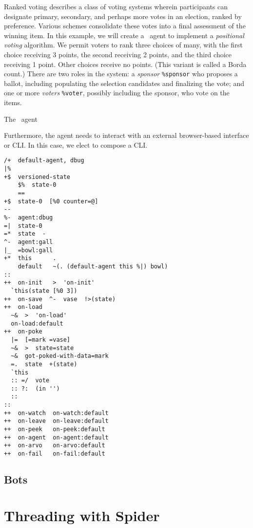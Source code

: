 Ranked voting describes a class of voting systems wherein participants can designate primary, secondary, and perhaps more votes in an election, ranked by preference.  Various schemes consolidate these votes into a final assessment of the winning item.  In this example, we will create a \gall~agent to implement a \emph{positional voting} algorithm.  We permit voters to rank three choices of many, with the first choice receiving 3 points, the second receiving 2 points, and the third choice receiving 1 point.  Other choices receive no points.  (This variant is called a Borda count.)  There are two roles in the system:  a \emph{sponsor} \texttt{\%sponsor} who proposes a ballot, including populating the selection candidates and finalizing the vote; and one or more \emph{voters} \texttt{\%voter}, possibly including the sponsor, who vote on the items.

\begin{example}

The \gall~agent

Furthermore, the agent needs to interact with an external browser-based interface or CLI.  In this case, we elect to compose a CLI.

\begin{lstlisting}
/+  default-agent, dbug
|%
+$  versioned-state
    $%  state-0
    ==
+$  state-0  [%0 counter=@]
--
%-  agent:dbug
=|  state-0
=*  state  -
^-  agent:gall
|_  =bowl:gall
+*  this      .
    default   ~(. (default-agent this %|) bowl)
::
++  on-init   >  'on-init'
  `this(state [%0 3])
++  on-save  ^-  vase  !>(state)
++  on-load
  ~&  >  'on-load'
  on-load:default
++  on-poke
  |=  [=mark =vase]
  ~&  >  state=state
  ~&  got-poked-with-data=mark
  =.  state  +(state)
  `this
  :: =/  vote
  :: ?:  (in '')
  ::
::
++  on-watch  on-watch:default
++  on-leave  on-leave:default
++  on-peek   on-peek:default
++  on-agent  on-agent:default
++  on-arvo   on-arvo:default
++  on-fail   on-fail:default
\end{lstlisting}

\end{example}


\subsection{Bots}

\section{Threading with Spider}

